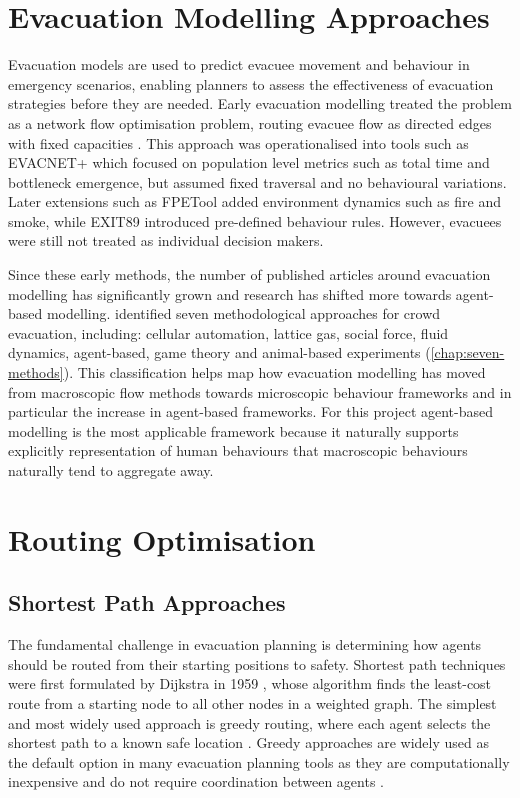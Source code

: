 \documentclass[12pt,a4paper]{report}
\begin{document}
\section{Evacuation Modelling Approaches}
Evacuation models are used to predict evacuee movement and behaviour in emergency scenarios, enabling planners to assess the effectiveness of evacuation strategies before they are needed. Early evacuation modelling treated the problem as a network flow optimisation problem, routing evacuee flow as directed edges with fixed capacities \citep{CHALMET_1982_NETWORK_FLOW}. This approach was operationalised into tools such as EVACNET+ \citep{KISKO_1985_EVACNET} which focused on population level metrics such as total time and bottleneck emergence, but assumed fixed traversal and no behavioural variations. Later extensions such as FPETool \citep{NELSON_1990_FPETOOL} added environment dynamics such as fire and smoke, while EXIT89 \citep{RITA_1991_EXIT89} introduced pre-defined behaviour rules. However, evacuees were still not treated as individual decision makers. 

Since these early methods, the number of published articles around evacuation modelling has significantly grown \citep{LIU_2020_GROWTH_EVAC_MODELLING} and research has shifted more towards agent-based modelling. \cite{ZHONG_2009_7_CROWD_BEHAVIOUR_MODELS} identified seven methodological approaches for crowd evacuation, including: cellular automation, lattice gas, social force, fluid dynamics, agent-based, game theory and animal-based experiments (\autoref{chap:seven-methods}). This classification helps map how evacuation modelling has moved from macroscopic flow methods towards microscopic behaviour frameworks and in particular the increase in agent-based frameworks. For this project agent-based modelling is the most applicable framework because it naturally supports explicitly representation of human behaviours that macroscopic behaviours naturally tend to aggregate away.

\section{Routing Optimisation}
\subsection{Shortest Path Approaches}
The fundamental challenge in evacuation planning is determining how agents should be routed from their starting positions to safety. Shortest path techniques were first formulated by Dijkstra in 1959 \citep{DIJKSTRA_2022_SHORT_PATHS}, whose algorithm finds the least-cost route from a starting node to all other nodes in a weighted graph. The simplest and most widely used approach is greedy routing, where each agent selects the shortest path to a known safe location \citep{MIZUMURA_2024_GREEDY_WIDE_USE}. Greedy approaches are widely used as the default option in many evacuation planning tools as they are computationally inexpensive and do not require coordination between agents \citep{CHEN_2014_GREEDY_IN_EVAC, MIRAHADI_2021_GREEDY_IN_EVAC}.
\end{document}
